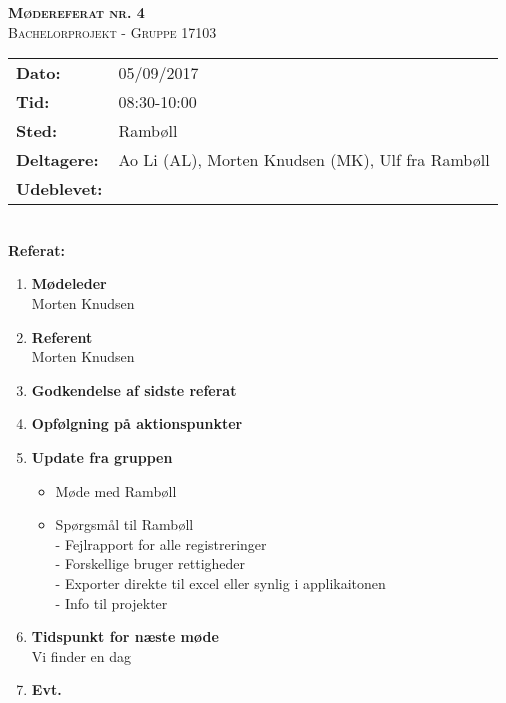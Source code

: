 
\newcommand{\HRule}{\rule{\linewidth}{0.1mm}}


	\begin{center}
		{\huge \bfseries \textsc{Mødereferat nr. 4}}\\
		\textsc{\large Bachelorprojekt - Gruppe 17103}\\[0.3cm]
	\end{center}
	\begin{tabular}{ll}
	\large \textbf{Dato:} & 05/09/2017  	\\ %
	\large \textbf{Tid:}  & 08:30-10:00 	\\ %
	\large \textbf{Sted:} & Rambøll		\\ %
	\large \textbf{Deltagere:} & Ao Li (AL), Morten Knudsen (MK), Ulf fra Rambøll \\
	\large \textbf{Udeblevet:}
	\end{tabular}\\
	\phantom{\,}\hspace{0.1em} \large \textbf{Referat:}
	\begin{enumerate}
		\itemsep 0.3em 
		\item \textbf{Mødeleder}\\
			Morten Knudsen
		\item \textbf{Referent}\\
			Morten Knudsen
		\item \textbf{Godkendelse af sidste referat}
			
		\item\textbf{ Opfølgning på aktionspunkter}

		\item \textbf{Update fra gruppen}
			\begin{itemize}[-]
			\item Møde med Rambøll\\
			
			\item Spørgsmål til Rambøll\\
			- Fejlrapport for alle registreringer \\
			- Forskellige bruger rettigheder \\
			- Exporter direkte til excel eller synlig i applikaitonen \\
			- Info til projekter
			
			
		\end{itemize}	
		\item \textbf{Tidspunkt for næste møde}\\
		Vi finder en dag
		\item \textbf{Evt.}
	\end{enumerate}
